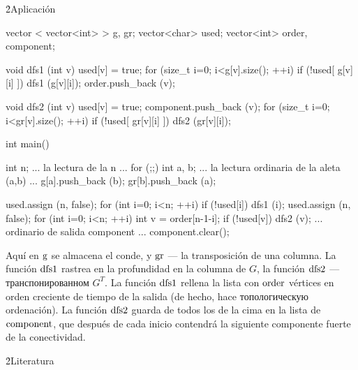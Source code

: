 \h2{Aplicación}

\code
vector < vector<int> > g, gr;
vector<char> used;
vector<int> order, component;

void dfs1 (int v) {
used[v] = true;
for (size_t i=0; i<g[v].size(); ++i)
if (!used[ g[v][i] ])
dfs1 (g[v][i]);
order.push_back (v);
}

void dfs2 (int v) {
used[v] = true;
component.push_back (v);
for (size_t i=0; i<gr[v].size(); ++i)
if (!used[ gr[v][i] ])
dfs2 (gr[v][i]);
}

int main() {
int n;
... la lectura de la n ...
for (;;) {
int a, b;
... la lectura ordinaria de la aleta (a,b) ...
g[a].push_back (b);
gr[b].push_back (a);
}

used.assign (n, false);
for (int i=0; i<n; ++i)
if (!used[i])
dfs1 (i);
used.assign (n, false);
for (int i=0; i<n; ++i) {
int v = order[n-1-i];
if (!used[v]) {
dfs2 (v);
... ordinario de salida component ...
component.clear();
}
}
}
\endcode

Aquí en $\rm g$ se almacena el conde, y $\rm gr$ --- la transposición de una columna. La función $\rm dfs1$ rastrea en la profundidad en la columna de $G$, la función $\rm dfs2$ --- транспонированном $G^T$. La función $\rm dfs1$ rellena la lista con $\rm order$ vértices en orden creciente de tiempo de la salida (de hecho, hace топологическую ordenación). La función $\rm dfs2$ guarda de todos los de la cima en la lista de $\rm component$, que después de cada inicio contendrá la siguiente componente fuerte de la conectividad.

\h2{Literatura}

\ul{
\li {}
\li {}
}